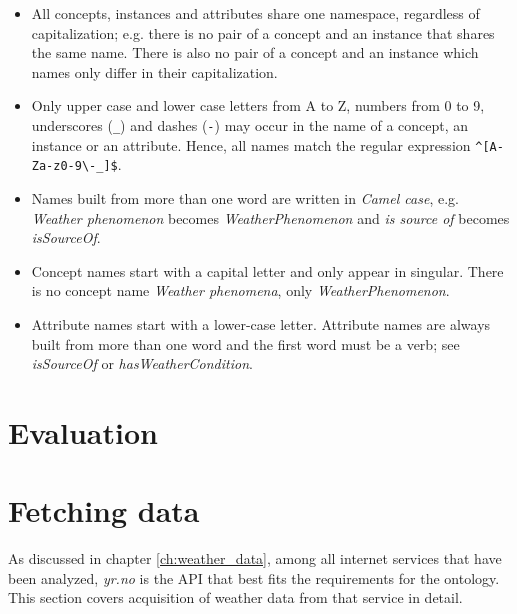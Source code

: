 \begin{itemize}
  \item All concepts, instances and attributes share one namespace, regardless of capitalization; e.g. there is no pair of a concept and an instance that shares the same name. There is also no pair of a concept and an instance which names only differ in their capitalization.
  \item Only upper case and lower case letters from A to Z, numbers from 0 to 9, underscores (\texttt{\_}) and dashes (\texttt{-}) may occur in the name of a concept, an instance or an attribute. Hence, all names match the regular expression \texttt{\^{}[A-Za-z0-9\textbackslash -\_]\$}.
  \item Names built from more than one word are written in \emph{Camel case}, e.g. \emph{Weather phenomenon} becomes \emph{WeatherPhenomenon} and \emph{is source of} becomes \emph{isSourceOf}. %
  \item Concept names start with a capital letter and only appear in singular. There is no concept name \emph{Weather phenomena}, only \emph{WeatherPhenomenon}.
  \item Attribute names start with a lower-case letter. Attribute names are always built from more than one word and the first word must be a verb; see \emph{isSourceOf} or \emph{hasWeatherCondition}.
\end{itemize}


\section{Evaluation}
\label{sec:ontology_evaluation}


\section{Fetching data}


As discussed in chapter \ref{ch:weather_data}, among all internet services that have been analyzed, \emph{yr.no} is the API that best fits the requirements for the \thinkhomeweather ontology. This section covers acquisition of weather data from that service in detail.

